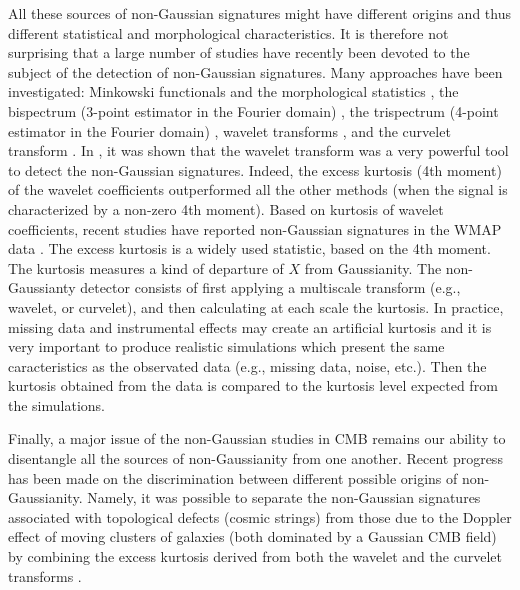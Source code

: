 All these sources of non-Gaussian signatures might have different origins and thus different statistical and morphological
characteristics. It is therefore not surprising that a large number of studies have recently been devoted to the subject 
of the detection of non-Gaussian signatures. Many approaches have been investigated: Minkowski functionals and the morphological 
statistics \citep{gauss:novikov00,gauss:shandarin02}, the bispectrum (3-point estimator in the Fourier domain) 
\citep{gauss:bromley99,gauss:verde00,gauss:phillips01}, the trispectrum (4-point estimator in the Fourier domain) \citep{gauss:kunz01}, 
wavelet transforms \citep{gauss:aghanim99,gauss:forni99,gauss:hobson99,gauss:barreiro01,gauss:cayon01,gauss:jewell01,starck:sta03_1}, 
and the curvelet transform \citep{starck:sta03_1}. In \citep{gauss:aghanim03,starck:sta03_1}, it was shown that the wavelet transform 
was a very powerful tool to detect the non-Gaussian signatures. Indeed, the excess kurtosis (4th moment) of the wavelet coefficients 
outperformed all the other methods (when the signal is characterized by a non-zero 4th moment). Based on kurtosis of wavelet coefficients, 
recent studies have reported non-Gaussian signatures in the WMAP data \citep{wave:vielva04,gauss:pia04,gauss:cruz05}.
The excess kurtosis is a widely used statistic, based on the 4th moment. 
The kurtosis measures a kind of departure of $X$ from Gaussianity. The non-Gaussianty detector consists of first applying 
a multiscale transform (e.g., wavelet, or curvelet), and then calculating at each scale the kurtosis. In practice, missing 
data and instrumental effects may create an artificial kurtosis and it is very important to produce realistic simulations 
which present the same caracteristics as the observated data (e.g., missing data, noise, etc.). Then the kurtosis obtained 
from the data is compared to the kurtosis level expected from the simulations.
 
Finally, a major issue of the non-Gaussian studies in CMB remains our ability to disentangle all the sources of non-Gaussianity 
from one another. Recent progress has been made on the discrimination between different possible origins of non-Gaussianity. 
Namely, it was possible to separate the non-Gaussian signatures associated with topological defects (cosmic strings) from those 
due to the Doppler effect of moving clusters of galaxies (both dominated by a Gaussian CMB field) by combining the excess kurtosis 
derived from both the wavelet and the curvelet transforms \citep{starck:sta03_1}. 

